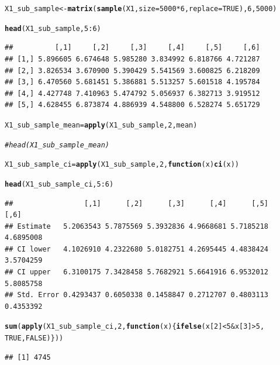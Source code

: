 \documentclass{article}\usepackage[]{graphicx}\usepackage[]{color}
\makeatletter
\newcommand{\hlnum}[1]{\textcolor[rgb]{0.686,0.059,0.569}{#1}}%
\newcommand{\hlcom}[1]{\textcolor[rgb]{0.678,0.584,0.686}{\textit{#1}}}%
\newcommand{\hlopt}[1]{\textcolor[rgb]{0,0,0}{#1}}%
\newcommand{\hlstd}[1]{\textcolor[rgb]{0.345,0.345,0.345}{#1}}%
\newcommand{\hlkwa}[1]{\textcolor[rgb]{0.161,0.373,0.58}{\textbf{#1}}}%
\newcommand{\hlkwb}[1]{\textcolor[rgb]{0.69,0.353,0.396}{#1}}%
\newcommand{\hlkwc}[1]{\textcolor[rgb]{0.333,0.667,0.333}{#1}}%
\newcommand{\hlkwd}[1]{\textcolor[rgb]{0.737,0.353,0.396}{\textbf{#1}}}%
\newenvironment{kframe}{%
 \def\at@end@of@kframe{}%
 \ifinner\ifhmode%
  \def\at@end@of@kframe{\end{minipage}}%
  \begin{minipage}{\columnwidth}%
 \fi\fi%
 \def\FrameCommand##1{\hskip\@totalleftmargin \hskip-\fboxsep
 \colorbox{shadecolor}{##1}\hskip-\fboxsep
     \hskip-\linewidth \hskip-\@totalleftmargin \hskip\columnwidth}%
 \MakeFramed {\advance\hsize-\width
   \@totalleftmargin\z@ \linewidth\hsize
   \@setminipage}}%
 {\par\unskip\endMakeFramed%
 \at@end@of@kframe}
\newenvironment{knitrout}{}{} %
\makeatother
\begin{document}
\begin{knitrout}
\color{fgcolor}\begin{kframe}
\begin{alltt}
\hlstd{X1_sub_sample} \hlkwb{<-} \hlkwd{matrix}\hlstd{(}\hlkwd{sample}\hlstd{(X1,} \hlkwc{size} \hlstd{=} \hlnum{5000} \hlopt{*}\hlnum{6}\hlstd{,} \hlkwc{replace} \hlstd{=} \hlnum{TRUE}\hlstd{),}\hlnum{6}\hlstd{,} \hlnum{5000}\hlstd{)}

\hlkwd{head}\hlstd{(X1_sub_sample,}\hlnum{5}\hlopt{:}\hlnum{6}\hlstd{)}
\end{alltt}
\begin{verbatim}
##          [,1]     [,2]     [,3]     [,4]     [,5]     [,6]
## [1,] 5.896605 6.674648 5.985280 3.834992 6.818766 4.721287
## [2,] 3.826534 3.670900 5.390429 5.541569 3.600825 6.218209
## [3,] 6.470560 5.681451 5.386881 5.513257 5.601518 4.195784
## [4,] 4.427748 7.410963 5.474792 5.056937 6.382713 3.919512
## [5,] 4.628455 6.873874 4.886939 4.548800 6.528274 5.651729
\end{verbatim}
\begin{alltt}
\hlstd{X1_sub_sample_mean} \hlkwb{=} \hlkwd{apply}\hlstd{(X1_sub_sample,} \hlnum{2}\hlstd{, mean)}

\hlcom{#head(X1_sub_sample_mean)}

\hlstd{X1_sub_sample_ci} \hlkwb{=} \hlkwd{apply}\hlstd{(X1_sub_sample,} \hlnum{2}\hlstd{,} \hlkwa{function}\hlstd{(}\hlkwc{x}\hlstd{)} \hlkwd{ci}\hlstd{(x))}

\hlkwd{head}\hlstd{(X1_sub_sample_ci,}\hlnum{5}\hlopt{:}\hlnum{6}\hlstd{)}
\end{alltt}
\begin{verbatim}
##                 [,1]      [,2]      [,3]      [,4]      [,5]      [,6]
## Estimate   5.2063543 5.7875569 5.3932836 4.9668681 5.7185218 4.6895008
## CI lower   4.1026910 4.2322680 5.0182751 4.2695445 4.4838424 3.5704259
## CI upper   6.3100175 7.3428458 5.7682921 5.6641916 6.9532012 5.8085758
## Std. Error 0.4293437 0.6050338 0.1458847 0.2712707 0.4803113 0.4353392
\end{verbatim}
\begin{alltt}
\hlkwd{sum}\hlstd{(}\hlkwd{apply}\hlstd{(X1_sub_sample_ci,} \hlnum{2}\hlstd{,} \hlkwa{function}\hlstd{(}\hlkwc{x}\hlstd{)\{}\hlkwd{ifelse}\hlstd{(x[}\hlnum{2}\hlstd{]} \hlopt{<} \hlnum{5} \hlopt{&} \hlstd{x[}\hlnum{3}\hlstd{]} \hlopt{>} \hlnum{5}\hlstd{,}
                                                  \hlnum{TRUE}\hlstd{,} \hlnum{FALSE}\hlstd{)\}))}
\end{alltt}
\begin{verbatim}
## [1] 4745
\end{verbatim}
\end{kframe}
\end{knitrout}
\end{document}
